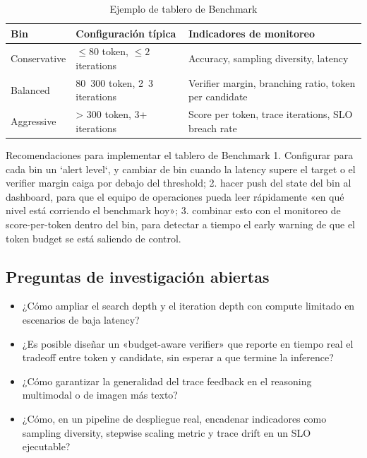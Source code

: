 \documentclass[a4paper]{article}
\begin{document}
\begin{table}[H]
\centering
\caption{Ejemplo de tablero de Benchmark}
\begin{tabular}{p{}p{}p{}}
\toprule
Bin & Configuración típica & Indicadores de monitoreo \\
\midrule
Conservative & $\leq 80$ token, $\leq 2$ iterations & Accuracy, sampling diversity, latency \\
Balanced & 80~300 token, 2~3 iterations & Verifier margin, branching ratio, token per candidate \\
Aggressive & > 300 token, 3+ iterations & Score per token, trace iterations, SLO breach rate \\
\bottomrule
\end{tabular}
\end{table}

\begin{importantbox}{Recomendaciones para implementar el tablero de Benchmark}
1. Configurar para cada bin un `alert level`, y cambiar de bin cuando la latency supere el target o el verifier margin caiga por debajo del threshold; 2. hacer push del state del bin al dashboard, para que el equipo de operaciones pueda leer rápidamente «en qué nivel está corriendo el benchmark hoy»; 3. combinar esto con el monitoreo de score-per-token dentro del bin, para detectar a tiempo el early warning de que el token budget se está saliendo de control.
\end{importantbox}

\subsection{Preguntas de investigación abiertas}
\begin{itemize}
\item ¿Cómo ampliar el search depth y el iteration depth con compute limitado en escenarios de baja latency?
\item ¿Es posible diseñar un «budget-aware verifier» que reporte en tiempo real el tradeoff entre token y candidate, sin esperar a que termine la inference?
\item ¿Cómo garantizar la generalidad del trace feedback en el reasoning multimodal o de imagen más texto?
\item ¿Cómo, en un pipeline de despliegue real, encadenar indicadores como sampling diversity, stepwise scaling metric y trace drift en un SLO ejecutable?
\end{itemize}
\end{document}
